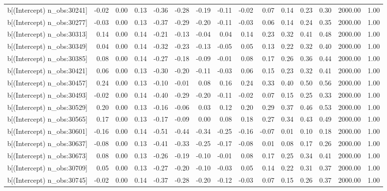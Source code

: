 \begin{table}[ht]
\begin{tabular}{rrrrrrrrrrrrrrr}
  b[(Intercept) n\_obs:30241] & -0.02 & 0.00 & 0.13 & -0.36 & -0.28 & -0.19 & -0.11 & -0.02 & 0.07 & 0.14 & 0.23 & 0.30 & 2000.00 & 1.00 \\ 
  b[(Intercept) n\_obs:30277] & -0.03 & 0.00 & 0.13 & -0.37 & -0.29 & -0.20 & -0.11 & -0.03 & 0.06 & 0.14 & 0.24 & 0.35 & 2000.00 & 1.00 \\ 
  b[(Intercept) n\_obs:30313] & 0.14 & 0.00 & 0.14 & -0.21 & -0.13 & -0.04 & 0.04 & 0.14 & 0.23 & 0.32 & 0.41 & 0.48 & 2000.00 & 1.00 \\ 
  b[(Intercept) n\_obs:30349] & 0.04 & 0.00 & 0.14 & -0.32 & -0.23 & -0.13 & -0.05 & 0.05 & 0.13 & 0.22 & 0.32 & 0.40 & 2000.00 & 1.00 \\ 
  b[(Intercept) n\_obs:30385] & 0.08 & 0.00 & 0.14 & -0.27 & -0.18 & -0.09 & -0.01 & 0.08 & 0.17 & 0.26 & 0.36 & 0.44 & 2000.00 & 1.00 \\ 
  b[(Intercept) n\_obs:30421] & 0.06 & 0.00 & 0.13 & -0.30 & -0.20 & -0.11 & -0.03 & 0.06 & 0.15 & 0.23 & 0.32 & 0.41 & 2000.00 & 1.00 \\ 
  b[(Intercept) n\_obs:30457] & 0.24 & 0.00 & 0.13 & -0.10 & -0.01 & 0.08 & 0.16 & 0.24 & 0.33 & 0.40 & 0.50 & 0.56 & 2000.00 & 1.00 \\ 
  b[(Intercept) n\_obs:30493] & -0.02 & 0.00 & 0.14 & -0.40 & -0.29 & -0.20 & -0.11 & -0.02 & 0.07 & 0.15 & 0.25 & 0.33 & 2000.00 & 1.00 \\ 
  b[(Intercept) n\_obs:30529] & 0.20 & 0.00 & 0.13 & -0.16 & -0.06 & 0.03 & 0.12 & 0.20 & 0.29 & 0.37 & 0.46 & 0.53 & 2000.00 & 1.00 \\ 
  b[(Intercept) n\_obs:30565] & 0.17 & 0.00 & 0.13 & -0.17 & -0.09 & 0.00 & 0.08 & 0.18 & 0.27 & 0.34 & 0.43 & 0.49 & 2000.00 & 1.00 \\ 
  b[(Intercept) n\_obs:30601] & -0.16 & 0.00 & 0.14 & -0.51 & -0.44 & -0.34 & -0.25 & -0.16 & -0.07 & 0.01 & 0.10 & 0.18 & 2000.00 & 1.00 \\ 
  b[(Intercept) n\_obs:30637] & -0.08 & 0.00 & 0.13 & -0.41 & -0.33 & -0.25 & -0.17 & -0.08 & 0.01 & 0.08 & 0.17 & 0.26 & 2000.00 & 1.00 \\ 
  b[(Intercept) n\_obs:30673] & 0.08 & 0.00 & 0.13 & -0.26 & -0.19 & -0.10 & -0.01 & 0.08 & 0.17 & 0.25 & 0.34 & 0.41 & 2000.00 & 1.00 \\ 
  b[(Intercept) n\_obs:30709] & 0.05 & 0.00 & 0.13 & -0.27 & -0.20 & -0.10 & -0.03 & 0.05 & 0.14 & 0.22 & 0.31 & 0.37 & 2000.00 & 1.00 \\ 
  b[(Intercept) n\_obs:30745] & -0.02 & 0.00 & 0.14 & -0.37 & -0.28 & -0.20 & -0.12 & -0.03 & 0.07 & 0.15 & 0.26 & 0.37 & 2000.00 & 1.00 \\ 

\end{tabular}
\end{table}
